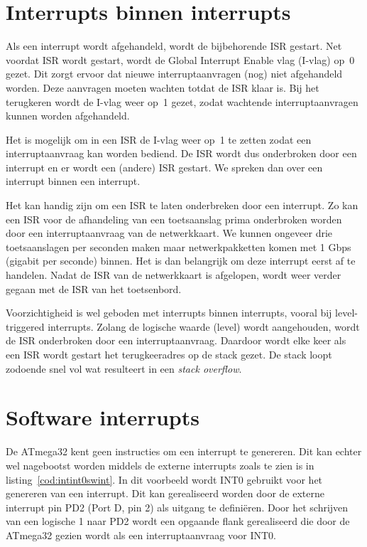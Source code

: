\section{Interrupts binnen interrupts}
Als een interrupt wordt afgehandeld, wordt de bijbehorende ISR gestart. Net
voordat ISR wordt gestart, wordt de Global Interrupt Enable vlag (I-vlag)
op~0 gezet. Dit zorgt ervoor dat nieuwe interruptaanvragen (nog) niet
afgehandeld worden. Deze aanvragen moeten wachten totdat de ISR klaar is.
Bij het terugkeren wordt de I-vlag weer op~1 gezet, zodat wachtende
interruptaanvragen kunnen worden afgehandeld.

Het is mogelijk om in een ISR de I-vlag weer op~1 te zetten zodat een
interruptaanvraag kan worden bediend. De ISR wordt dus onderbroken door
een interrupt en er wordt een (andere) ISR gestart. We spreken dan over
een interrupt binnen een interrupt.

Het kan handig zijn om een ISR te laten onderbreken door een interrupt.
Zo kan een ISR voor de afhandeling van een toetsaanslag prima onderbroken
worden door een interruptaanvraag van de netwerkkaart. We kunnen ongeveer
drie toetsaanslagen per seconden maken maar netwerkpakketten komen met
1 Gbps (gigabit per seconde) binnen. Het is dan belangrijk om deze
interrupt eerst af te handelen. Nadat de ISR van de netwerkkaart is
afgelopen, wordt weer verder gegaan met de ISR van het toetsenbord.

Voorzichtigheid is wel geboden met interrupts binnen interrupts, vooral
bij level-triggered interrupts. Zolang de logische waarde (level) wordt
aangehouden, wordt de ISR onderbroken door een interruptaanvraag. Daardoor
wordt elke keer als een ISR wordt gestart het terugkeeradres op de stack
gezet. De stack loopt zodoende snel vol wat resulteert in een \textsl{stack
overflow}.

\section{Software interrupts}
De ATmega32 kent geen instructies om een interrupt te genereren. Dit kan
echter wel nagebootst worden middels de externe interrupts zoals te zien
is in listing~\ref{cod:intint0swint}. In dit voorbeeld wordt INT0 gebruikt
voor het genereren van een interrupt. Dit kan gerealiseerd worden door
de externe interrupt pin PD2 (Port D, pin 2) als uitgang te defini\"eren.
Door het schrijven van een logische 1 naar PD2 wordt een opgaande flank
gerealiseerd die door de ATmega32 gezien wordt als een interruptaanvraag
voor INT0.

